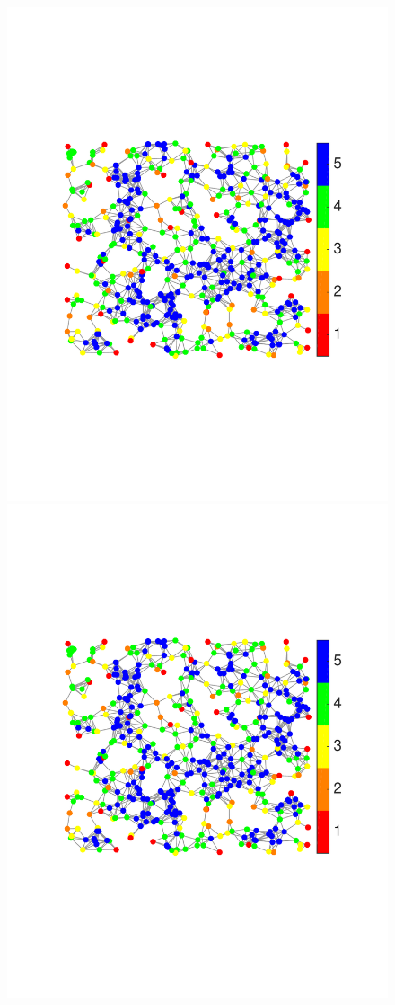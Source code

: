 \documentclass[journal, 10pt]{IEEEtran}
\begin{document}
\begin{figure}[t]
\begin{minipage}[m]{0.43\linewidth}
\centerline{\includegraphics[width=.88\linewidth]{fig_uniq_part_sensor3}}
\end{minipage}
\hspace{.003\linewidth}
\begin{minipage}[m]{0.05\linewidth}
\centerline{\includegraphics[width=.85\linewidth]{fig_uniq_part_col2}}

\end{minipage}
\end{figure}
\end{document}
